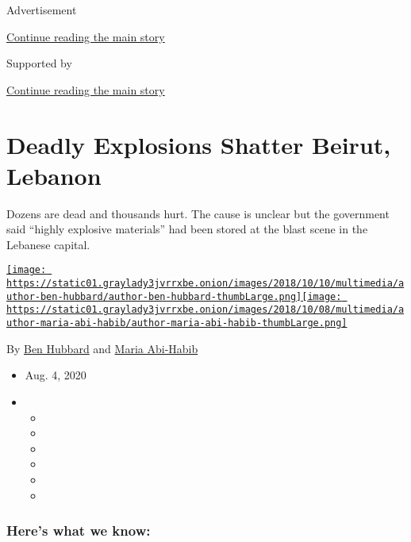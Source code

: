 Advertisement

\protect\hyperlink{after-top}{Continue reading the main story}

Supported by

\protect\hyperlink{after-sponsor}{Continue reading the main story}

\hypertarget{deadly-explosions-shatter-beirut-lebanon}{%
\section{Deadly Explosions Shatter Beirut,
Lebanon}\label{deadly-explosions-shatter-beirut-lebanon}}

Dozens are dead and thousands hurt. The cause is unclear but the
government said ``highly explosive materials'' had been stored at the
blast scene in the Lebanese capital.

\href{https://www.nytimes3xbfgragh.onion/by/ben-hubbard}{\texttt{[image: https://static01.graylady3jvrrxbe.onion/images/2018/10/10/multimedia/author-ben-hubbard/author-ben-hubbard-thumbLarge.png]}}\href{https://www.nytimes3xbfgragh.onion/by/maria-abi-habib}{\texttt{[image: https://static01.graylady3jvrrxbe.onion/images/2018/10/08/multimedia/author-maria-abi-habib/author-maria-abi-habib-thumbLarge.png]}}

By \href{https://www.nytimes3xbfgragh.onion/by/ben-hubbard}{Ben Hubbard}
and \href{https://www.nytimes3xbfgragh.onion/by/maria-abi-habib}{Maria
Abi-Habib}

\begin{itemize}
\item
  Aug. 4, 2020
\item
  \begin{itemize}
  \item
  \item
  \item
  \item
  \item
  \item
  \end{itemize}
\end{itemize}

\hypertarget{heres-what-we-know}{%
\subsubsection{Here's what we know:}\label{heres-what-we-know}}

